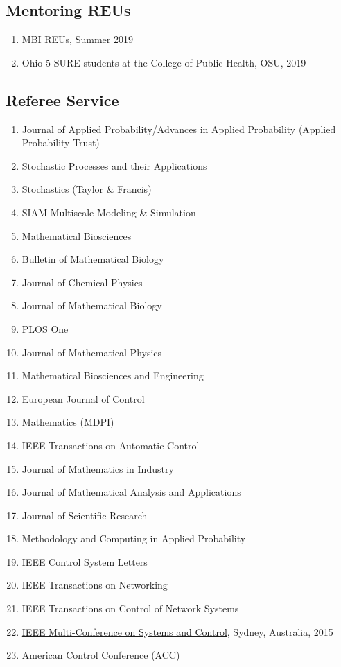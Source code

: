 \documentclass[11pt,a4paper,sans]{moderncv}        %
\begin{document}
\subsection{Mentoring REUs}
\begin{enumerate}
\item{MBI REUs, Summer 2019}
\item{Ohio 5 SURE students at the College of Public Health, OSU, 2019}
\end{enumerate}


\subsection{Referee Service}
\begin{enumerate}
	\item {Journal of Applied Probability/Advances in Applied Probability (Applied Probability Trust)}
	\item {Stochastic Processes and their Applications}
	\item Stochastics (Taylor \& Francis)
	\item SIAM Multiscale Modeling \& Simulation
	\item Mathematical Biosciences
	\item {Bulletin of Mathematical Biology}
	\item {Journal of Chemical Physics}
    \item {Journal of Mathematical Biology}
    \item {PLOS One}
    \item Journal of Mathematical Physics
    \item Mathematical Biosciences and Engineering
    \item European Journal of Control 
    \item {Mathematics (MDPI)}
	\item {IEEE Transactions on Automatic Control}
	\item Journal of Mathematics in Industry 
	\item Journal of Mathematical Analysis and Applications
	\item Journal of Scientific Research  
	\item Methodology and Computing in Applied Probability
	\item IEEE Control System Letters
	\item {IEEE Transactions on Networking}
    \item {IEEE Transactions on Control of Network Systems}
	\item {\href{http://msc2015.ieeecss.org/}{IEEE Multi-Conference on Systems and Control}, Sydney, Australia, 2015}
	\item American Control Conference (ACC)
\end{enumerate}
\end{document}
